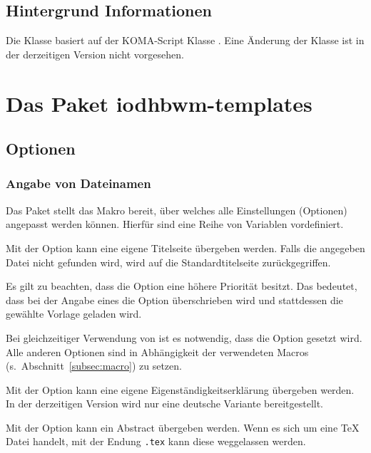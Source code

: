 \documentclass[babel=ngerman,highlight=false]{skdoc}
\begin{document}
        \subsection{Hintergrund Informationen}
            Die Klasse basiert auf der KOMA-Script Klasse . Eine Änderung der Klasse ist in der derzeitigen Version \theversion{} nicht vorgesehen.

    \section{Das Paket iodhbwm-templates}\label{pkg:iodhbwm-templates}
        \subsection{Optionen}\label{pkg:options}
            \subsubsection{Angabe von Dateinamen}
                Das Paket stellt das Makro \Macro{} bereit, über welches alle Einstellungen (Optionen) angepasst werden können. Hierfür sind eine Reihe von  Variablen vordefiniert.\medskip

                Mit der Option kann eine eigene Titelseite übergeben werden. Falls die angegeben Datei nicht gefunden wird, wird auf die Standardtitelseite zurückgegriffen.

                Es gilt zu beachten, dass die Option  eine höhere Priorität besitzt. Das bedeutet, dass bei der Angabe eines  die Option  überschrieben wird und stattdessen die gewählte Vorlage geladen wird.

                Bei gleichzeitiger Verwendung von \Macro\dhbwdeclaration ist es notwendig, dass die Option  gesetzt wird. Alle anderen Optionen sind in Abhängigkeit der verwendeten Macros (s.~Abschnitt~\ref{subsec:macro}) zu setzen.\medskip

                Mit der Option kann eine eigene Eigenständigkeitserklärung übergeben werden. In der derzeitigen Version wird nur eine deutsche Variante bereitgestellt.\medskip

                Mit der Option kann ein Abstract übergeben werden. Wenn es sich um eine \TeX{} Datei handelt, mit der Endung \texttt{.tex} kann diese weggelassen werden.\medskip
\end{document}
